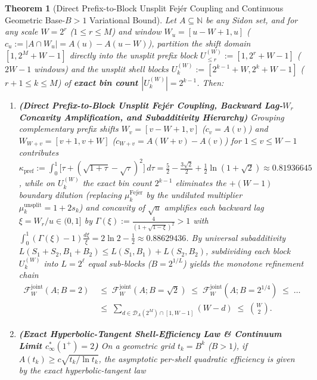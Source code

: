 \documentclass[11pt,reqno]{amsart}
\newtheorem{theorem}{Theorem}[section]
\theoremstyle{definition}
\theoremstyle{remark}
\begin{document}
\begin{theorem}[Direct Prefix-to-Block Unsplit Fej\'er Coupling and Continuous Geometric Base-$B > 1$ Variational Bound]\label{thm:base_b_joint}
Let $A \subseteq \mathbb{N}$ be any Sidon set, and for any scale $W = 2^r$ ($1 \le r \le M$) and window $W_u = [u - W + 1, u]$ ($c_u := |A \cap W_u| = A(u) - A(u - W)$), partition the shift domain $[1, 2^M + W - 1]$ directly into the unsplit prefix block $U_{\le r}^{(W)} := [1, 2^r + W - 1]$ ($2W - 1$ windows) and the unsplit shell blocks $U_k^{(W)} := [2^{k-1} + W, 2^k + W - 1]$ ($r + 1 \le k \le M$) of \textbf{exact bin count $|U_k^{(W)}| = 2^{k-1}$}. Then:
\begin{enumerate}
  \item[\textup{(a)}] \textbf{(Direct Prefix-to-Block Unsplit Fej\'er Coupling, Backward Lag-$W_r$ Concavity Amplification, and Subadditivity Hierarchy)} Grouping complementary prefix shifts $W_v = [v - W + 1, v]$ ($c_v = A(v)$) and $W_{W+v} = [v + 1, v + W]$ ($c_{W+v} = A(W + v) - A(v)$) for $1 \le v \le W - 1$ contributes $\kappa_{\mathrm{pref}} := \int_0^1 \bigl[\tau + (\sqrt{1+\tau}-\sqrt{\tau})^2\bigr]\,d\tau = \frac{5}{2} - \frac{3\sqrt{2}}{2} + \frac{1}{2}\ln(1 + \sqrt{2}) \approx 0.81936645$, while on $U_k^{(W)}$ the exact bin count $2^{k-1}$ eliminates the $+ (W - 1)$ boundary dilution (replacing $\mu_k^{\mathrm{Fej\acute{e}r}}$ by the undiluted multiplier $\mu_k^{\mathrm{unsplit}} = 1 + 2 s_k$) and concavity of $\sqrt{u}$ amplifies each backward lag $\xi = W_r / u \in (0, 1]$ by $\Gamma(\xi) := \frac{4}{(1 + \sqrt{1 - \xi})^2} > 1$ with $\int_0^1 (\Gamma(\xi) - 1)\frac{d\xi}{\xi} = 2\ln 2 - \frac{1}{2} \approx 0.88629436$. By universal subadditivity $L(S_1 + S_2, B_1 + B_2) \le L(S_1, B_1) + L(S_2, B_2)$, subdividing each block $U_k^{(W)}$ into $L = 2^\ell$ equal sub-blocks ($B = 2^{1/L}$) yields the monotone refinement chain
  \begin{equation}\label{eq:refinement_hierarchy}
    \begin{aligned}
      \mathcal{F}_W^{\mathrm{joint}}(A; B=2) &\;\le\; \mathcal{F}_W^{\mathrm{joint}}(A; B=\sqrt{2}) \;\le\; \mathcal{F}_W^{\mathrm{joint}}(A; B=2^{1/4}) \;\le\; \dots \\
      &\;\le\; \sum_{d \in \mathcal{D}_A(2^M)\cap[1,W-1]} (W - d) \;\le\; \binom{W}{2}.
    \end{aligned}
  \end{equation}
  \item[\textup{(b)}] \textbf{(Exact Hyperbolic-Tangent Shell-Efficiency Law \& Continuum Limit $c_\infty^*(1^+) = 2$)} On a geometric grid $t_k = B^k$ ($B > 1$), if $A(t_k) \ge c\sqrt{t_k / \ln t_k}$, the asymptotic per-shell quadratic efficiency is given by the exact hyperbolic-tangent law

\end{enumerate}
\end{theorem}
\end{document}
